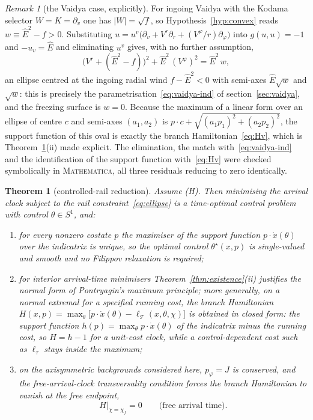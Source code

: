 \documentclass[12pt]{iopart}
\newcommand{\Ehat}{\hat E}
\theoremstyle{plain}
\newtheorem{theorem}{Theorem}
\theoremstyle{definition}
\theoremstyle{plain}
\theoremstyle{remark}
\newtheorem*{remark}{Remark}
\newcommand{\Ithm}[1]{\setcounter{theorem}{\numexpr#1-1\relax}}
\begin{document}
\begin{remark}[the Vaidya case, explicitly]\label{rem:vaidya-indicatrix}
For ingoing Vaidya with the Kodama selector $W=K=\partial_v$ one has $|W|=\sqrt f$, so
Hypothesis~\ref{hyp:convex} reads $w\equiv\Ehat^2-f>0$. Substituting
$u=u^v\big(\partial_v+V^r\partial_r+(V^\varphi/r)\partial_\varphi\big)$ into
$g(u,u)=-1$ and $-u_v=\Ehat$ and eliminating $u^v$ gives, with no further assumption,
\[
   \big(V^r+(\Ehat^2-f)\big)^2+\Ehat^2\,(V^\varphi)^2=\Ehat^2\,w ,
\]
an ellipse centred at the ingoing radial wind $f-\Ehat^2<0$ with semi-axes $\Ehat\sqrt w$
and $\sqrt w$: this is precisely the parametrisation~\eqref{eq:vaidya-ind} of
section~\ref{sec:vaidya}, and the freezing surface is $w=0$. Because the maximum of a
linear form over an ellipse of centre $c$ and semi-axes $(a_1,a_2)$ is
$p\cdot c+\sqrt{(a_1p_1)^2+(a_2p_2)^2}$, the support function of this oval is exactly the
branch Hamiltonian~\eqref{eq:Hv}, which is Theorem~\ref{thm:rail}(ii) made explicit. The
elimination, the match with~\eqref{eq:vaidya-ind} and the identification of the support
function with~\eqref{eq:Hv} were checked symbolically in \textsc{Mathematica}, all three
residuals reducing to zero identically.
\end{remark}

\Ithm{1}
\begin{theorem}[controlled-rail reduction]\label{thm:rail}
Assume (H). Then minimising the arrival clock subject to the rail
constraint~\eqref{eq:ellipse} is a time-optimal control problem with control
$\theta\in S^1$, and:
\begin{enumerate}
\item[(i)] for every nonzero costate $p$ the maximiser of the support function
$p\cdot\dot x(\theta)$ over the indicatrix is unique, so the optimal control
$\theta^\star(x,p)$ is single-valued and smooth and no Filippov relaxation is required;
\item[(ii)] for interior arrival-time minimisers Theorem~\ref{thm:existence}(ii)
justifies the normal form of Pontryagin's maximum principle; more generally, on a
normal extremal for a specified running cost, the branch Hamiltonian
$H(x,p)=\max_\theta\big[p\cdot\dot x(\theta)-\ell_{\mathcal T}(x,\theta,\chi)\big]$ is
obtained in closed form: the support function $h(p)=\max_\theta p\cdot\dot x(\theta)$ of the
indicatrix minus the running cost, so $H=h-1$ for a unit-cost clock, while a
control-dependent cost such as $\ell_\tau$ stays inside the maximum;
\item[(iii)] on the axisymmetric backgrounds considered here, $p_\varphi=J$ is conserved,
and the free-arrival-clock transversality
condition forces the branch Hamiltonian to vanish at the free endpoint,
\begin{equation}
    H\big|_{\chi=\chi_f}=0 \qquad\text{(free arrival time).}
    \label{eq:transversality}
\end{equation}
\end{enumerate}
\end{theorem}
\end{document}
